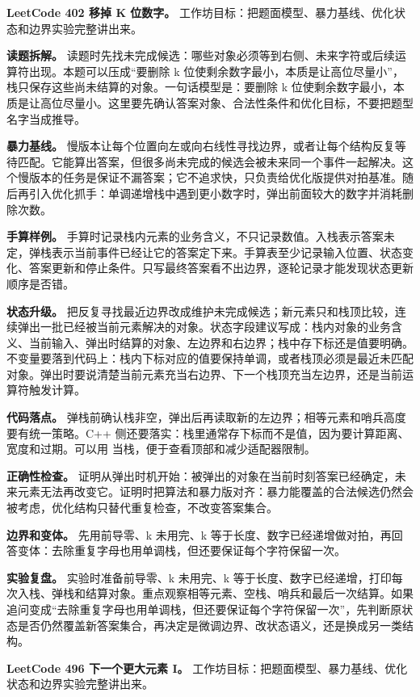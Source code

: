 \noindent\textbf{LeetCode 402 移掉 K 位数字。} 工作坊目标：把题面模型、暴力基线、优化状态和边界实验完整讲出来。

\textbf{读题拆解。} 读题时先找未完成候选：哪些对象必须等到右侧、未来字符或后续运算符出现。本题可以压成“要删除 k 位使剩余数字最小，本质是让高位尽量小”，栈只保存这些尚未结算的对象。一句话模型是：要删除 k 位使剩余数字最小，本质是让高位尽量小。这里要先确认答案对象、合法性条件和优化目标，不要把题型名字当成推导。

\textbf{暴力基线。} 慢版本让每个位置向左或向右线性寻找边界，或者让每个结构反复等待匹配。它能算出答案，但很多尚未完成的候选会被未来同一个事件一起解决。这个慢版本的任务是保证不漏答案；它不追求快，只负责给优化版提供对拍基准。随后再引入优化抓手：单调递增栈中遇到更小数字时，弹出前面较大的数字并消耗删除次数。

\textbf{手算样例。} 手算时记录栈内元素的业务含义，不只记录数值。入栈表示答案未定，弹栈表示当前事件已经让它的答案定下来。手算表至少记录输入位置、状态变化、答案更新和停止条件。只写最终答案看不出边界，逐轮记录才能发现状态更新顺序是否错。

\textbf{状态升级。} 把反复寻找最近边界改成维护未完成候选；新元素只和栈顶比较，连续弹出一批已经被当前元素解决的对象。状态字段建议写成：栈内对象的业务含义、当前输入、弹出时结算的对象、左边界和右边界；栈中存下标还是值要明确。不变量要落到代码上：栈内下标对应的值要保持单调，或者栈顶必须是最近未匹配对象。弹出时要说清楚当前元素充当右边界、下一个栈顶充当左边界，还是当前运算符触发计算。

\textbf{代码落点。} 弹栈前确认栈非空，弹出后再读取新的左边界；相等元素和哨兵高度要有统一策略。C++ 侧还要落实：栈里通常存下标而不是值，因为要计算距离、宽度和过期。可以用  当栈，便于查看顶部和减少适配器限制。

\textbf{正确性检查。} 证明从弹出时机开始：被弹出的对象在当前时刻答案已经确定，未来元素无法再改变它。证明时把算法和暴力版对齐：暴力能覆盖的合法候选仍然会被考虑，优化结构只替代重复检查，不改变答案集合。

\textbf{边界和变体。} 先用前导零、k 未用完、k 等于长度、数字已经递增做对拍，再回答变体：去除重复字母也用单调栈，但还要保证每个字符保留一次。

\textbf{实验复盘。} 实验时准备前导零、k 未用完、k 等于长度、数字已经递增，打印每次入栈、弹栈和结算对象。重点观察相等元素、空栈、哨兵和最后一次结算。如果追问变成“去除重复字母也用单调栈，但还要保证每个字符保留一次”，先判断原状态是否仍然覆盖新答案集合，再决定是微调边界、改状态语义，还是换成另一类结构。

\noindent\textbf{LeetCode 496 下一个更大元素 I。} 工作坊目标：把题面模型、暴力基线、优化状态和边界实验完整讲出来。

